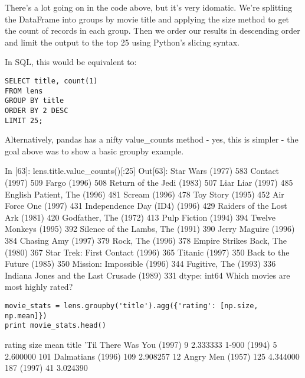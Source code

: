 \documentclass[11pt]{article} %
\begin{document}
There's a lot going on in the code above, but it's very idomatic. We're splitting the DataFrame into groups by movie title and applying the size method to get the count of records in each group. Then we order our results in descending order and limit the output to the top 25 using Python's slicing syntax.

In SQL, this would be equivalent to:

\begin{framed}
\begin{verbatim}
SELECT title, count(1)
FROM lens
GROUP BY title
ORDER BY 2 DESC
LIMIT 25;
\end{verbatim}
\end{framed}
Alternatively, pandas has a nifty value_counts method - yes, this is simpler - the goal above was to show a basic groupby example.

In [63]:
lens.title.value_counts()[:25]
Out[63]:
Star Wars (1977)                             583
Contact (1997)                               509
Fargo (1996)                                 508
Return of the Jedi (1983)                    507
Liar Liar (1997)                             485
English Patient, The (1996)                  481
Scream (1996)                                478
Toy Story (1995)                             452
Air Force One (1997)                         431
Independence Day (ID4) (1996)                429
Raiders of the Lost Ark (1981)               420
Godfather, The (1972)                        413
Pulp Fiction (1994)                          394
Twelve Monkeys (1995)                        392
Silence of the Lambs, The (1991)             390
Jerry Maguire (1996)                         384
Chasing Amy (1997)                           379
Rock, The (1996)                             378
Empire Strikes Back, The (1980)              367
Star Trek: First Contact (1996)              365
Titanic (1997)                               350
Back to the Future (1985)                    350
Mission: Impossible (1996)                   344
Fugitive, The (1993)                         336
Indiana Jones and the Last Crusade (1989)    331
dtype: int64
Which movies are most highly rated?


\begin{framed}
\begin{verbatim}
movie_stats = lens.groupby('title').agg({'rating': [np.size, np.mean]})
print movie_stats.head()
\end{verbatim}
\end{framed}
                           rating          
                             size      mean
title                                      
'Til There Was You (1997)       9  2.333333
1-900 (1994)                    5  2.600000
101 Dalmatians (1996)         109  2.908257
12 Angry Men (1957)           125  4.344000
187 (1997)                     41  3.024390
\end{document}
